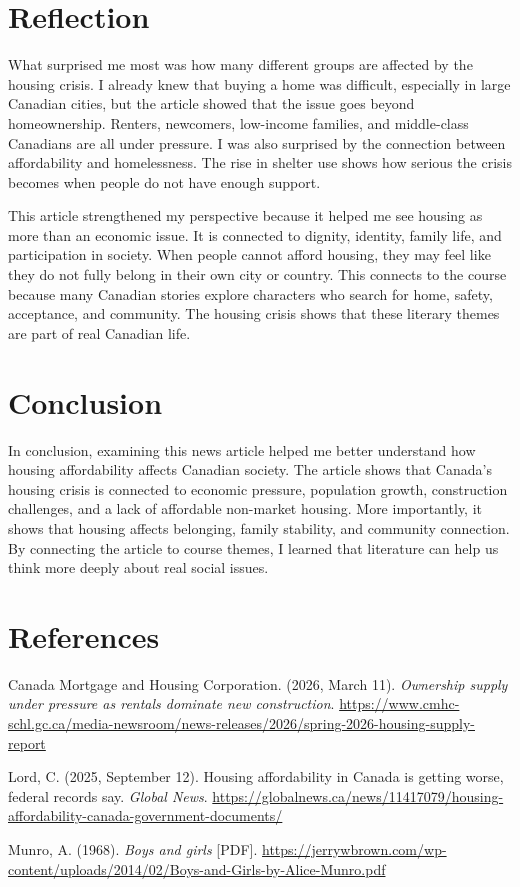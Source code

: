 \documentclass[12pt]{article}
\begin{document}
\section*{Reflection}

What surprised me most was how many different groups are affected by the housing crisis. I already knew that buying a home was difficult, especially in large Canadian cities, but the article showed that the issue goes beyond homeownership. Renters, newcomers, low-income families, and middle-class Canadians are all under pressure. I was also surprised by the connection between affordability and homelessness. The rise in shelter use shows how serious the crisis becomes when people do not have enough support.

This article strengthened my perspective because it helped me see housing as more than an economic issue. It is connected to dignity, identity, family life, and participation in society. When people cannot afford housing, they may feel like they do not fully belong in their own city or country. This connects to the course because many Canadian stories explore characters who search for home, safety, acceptance, and community. The housing crisis shows that these literary themes are part of real Canadian life.

\section*{Conclusion}

In conclusion, examining this news article helped me better understand how housing affordability affects Canadian society. The article shows that Canada's housing crisis is connected to economic pressure, population growth, construction challenges, and a lack of affordable non-market housing. More importantly, it shows that housing affects belonging, family stability, and community connection. By connecting the article to course themes, I learned that literature can help us think more deeply about real social issues.

\clearpage

\section*{References}

\hangindent=0.5in\noindent Canada Mortgage and Housing Corporation. (2026, March 11). \textit{Ownership supply under pressure as rentals dominate new construction}. \url{https://www.cmhc-schl.gc.ca/media-newsroom/news-releases/2026/spring-2026-housing-supply-report}

\vspace{1em}

\hangindent=0.5in\noindent Lord, C. (2025, September 12). Housing affordability in Canada is getting worse, federal records say. \textit{Global News}. \url{https://globalnews.ca/news/11417079/housing-affordability-canada-government-documents/}

\vspace{1em}

\hangindent=0.5in\noindent Munro, A. (1968). \textit{Boys and girls} [PDF]. \url{https://jerrywbrown.com/wp-content/uploads/2014/02/Boys-and-Girls-by-Alice-Munro.pdf}
\end{document}
